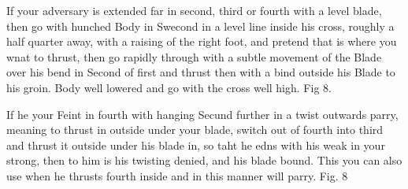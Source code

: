 \newpage


\newpage

If your adversary is extended far in second, third or fourth with a
level blade, then go with hunched Body in Swecond in a level line
inside his cross, roughly a half quarter away, with a raising of the
right foot, and pretend that is where you wnat to thrust, then go
rapidly through with a subtle movement of the Blade over his bend in
Second of first and thrust then with a bind outside his Blade to his
groin. Body well lowered and go with the cross well high. Fig 8.


\exercise{}
If he your Feint in fourth with hanging Secund further in a twist
outwards parry, meaning to thrust in outside under your blade, switch
out of fourth into third and thrust it outside under his blade in, so
taht he edns with his weak in your strong, then to him is his twisting
denied, and his blade bound. This you can also use when he thrusts
fourth inside and in this manner will parry. Fig. 8

